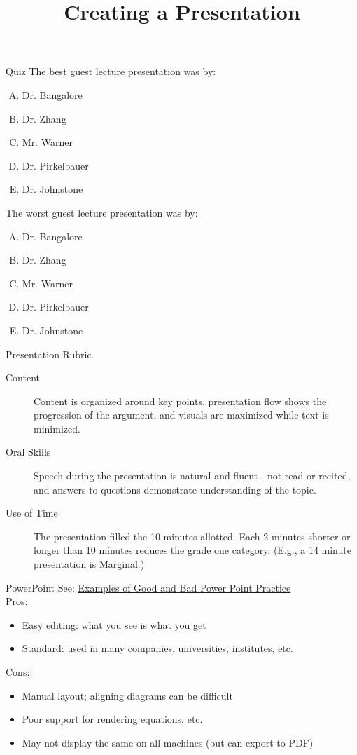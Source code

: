 \documentclass{beamer}
\title{Creating a Presentation}
\date{}
\begin{document}
\begin{frame}
\titlepage
\end{frame}

\begin{frame}{Quiz}
The best guest lecture presentation was by:
\begin{enumerate}[(A)]
\item Dr. Bangalore
\item Dr. Zhang
\item Mr. Warner
\item Dr. Pirkelbauer
\item Dr. Johnstone
\end{enumerate}
The worst guest lecture presentation was by:
\begin{enumerate}[(A)]
\item Dr. Bangalore
\item Dr. Zhang
\item Mr. Warner
\item Dr. Pirkelbauer
\item Dr. Johnstone
\end{enumerate}
\end{frame}

\begin{frame}{Presentation Rubric}
\begin{description}
\item[Content] Content is organized around key points, presentation flow shows the progression of the argument, and visuals are maximized while text is minimized.
\item[Oral Skills] Speech during the presentation is natural and fluent - not read or recited, and answers to questions demonstrate understanding of the topic.
\item[Use of Time] The presentation filled the 10 minutes allotted. Each 2 minutes shorter or longer than 10 minutes reduces the grade one category. (E.g., a 14 minute presentation is Marginal.)
\end{description}
\end{frame}

\begin{frame}{PowerPoint}
See: \href{http://www.feg-consulting.com/resource/practitioners-guide-to-hea/annexes-practitioners-guide/chapter-5/annex-d/}{Examples of Good and Bad Power Point Practice}\\
\bigskip
Pros:
\begin{itemize}
\item Easy editing: what you see is what you get
\item Standard: used in many companies, universities, institutes, etc.
\end{itemize}
Cons:
\begin{itemize}
\item Manual layout; aligning diagrams can be difficult
\item Poor support for rendering equations, etc.
\item May not display the same on all machines (but can export to PDF)
\end{itemize}
\end{frame}
\end{document}

